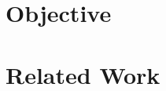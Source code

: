 \section{Objective} \label{sec:objective}








\section{Related Work} \label{sec:related_work}



